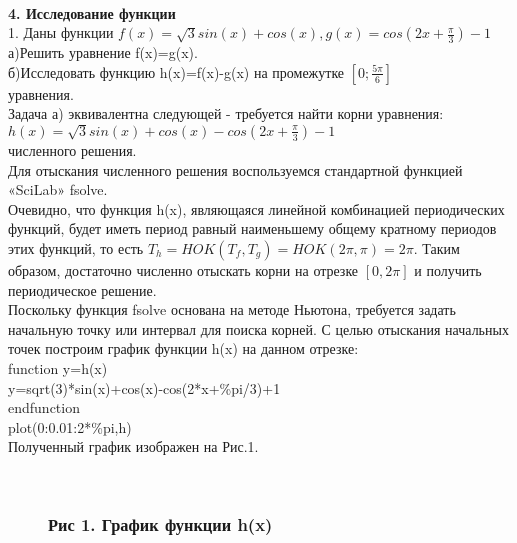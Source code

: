﻿ \documentclass[russian,utf8,nocolumnxxxi,nocolumnxxxii]{eskdtext}
\begin{document}
\begin{figure}[H]
\begin{center}
\begin{minipage}[h]{0.65\linewidth}
  \\
\end{minipage}
\end{center}
\end{figure}


\newpage


\newpage
{\bf4. Исследование функции}
\\1. Даны функции $f(x)=\sqrt{3}sin(x)+cos(x),g(x)=cos(2x+\frac{\pi}{3})-1$
\\а)Решить уравнение f(x)=g(x).
\\б)Исследовать функцию h(x)=f(x)-g(x) на промежутке $[0;\frac{5\pi}{6}]$\\
{ уравнения.}\\
Задача а) эквивалентна следующей - требуется найти корни уравнения:\\
$h(x)=\sqrt{3}sin(x)+cos(x)-cos(2x+\frac{\pi}{3})-1$\\

{ численного решения.}\\
Для отыскания численного решения воспользуемся стандартной функцией «SciLab» fsolve.\\
Очевидно, что функция h(x), являющаяся линейной комбинацией периодических функций, будет иметь период равный наименьшему общему кратному периодов этих функций, то есть $T_h=HOK(T_f,T_g)=HOK(2\pi,\pi)=2\pi.$ Таким образом, достаточно численно отыскать корни на отрезке $[0,2\pi]$ и получить периодическое решение. \\
Поскольку функция fsolve основана на методе Ньютона, требуется задать начальную точку или интервал для поиска корней. С целью отыскания начальных точек построим график функции h(x) на данном отрезке:\\
function y=h(x)\\
y=sqrt(3)*sin(x)+cos(x)-cos(2*x+\%pi/3)+1\\
endfunction\\
plot(0:0.01:2*\%pi,h)\\
Полученный график изображен на Рис.1.
\newpage

\begin{figure}[H]
\begin{center}
\begin{minipage}[h]{0.65\linewidth}
  \\
\frametitle{ Рис 1. График функции h(x)}
\end{minipage}
\end{center}
\end{figure}
\end{document}

